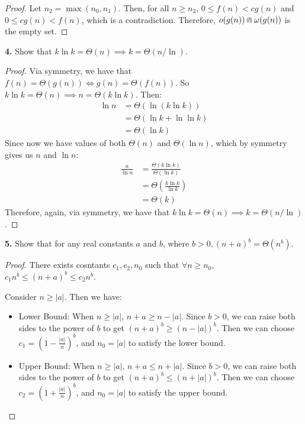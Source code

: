 \documentclass[addpoints]{exam}
\begin{document}
\begin{questions}
\begin{solution}
\begin{proof}
      Let $ n_2 = \max(n_0, n_1) $. Then, for all $ n \geq n_2 $, $ 0 \leq f(n) < cg(n) $ and $ 0 \leq cg(n) < f(n) $, which is a contradiction. Therefore, $ o(g(n)) \doublecap \omega(g(n)) $ is the empty set.
    \end{proof}
  \end{solution}
  \newpage
  \question
  \textbf{4. } Show that $ k \ln k = \Theta(n) \implies k = \Theta(n / \ln) $.
  \begin{solution}
    \begin{proof} \vspace*{-4mm}
      Via symmetry, we have that $ f(n) = \Theta(g(n)) \iff g(n) = \Theta(f(n)) $. So $ k \ln k = \Theta(n) \implies n = \Theta(k\ln k)  $. Then: \vspace*{-2mm}
      \begin{align*}
        \ln n & = \Theta(\ln(k\ln k))       \\
              & = \Theta(\ln k + \ln \ln k) \\
              & = \Theta(\ln k)
      \end{align*}
      Since now we have values of both $ \Theta(n) $ and $ \Theta(\ln n) $, which by symmetry gives us $n$ and $\ln n$: \vspace*{-2mm}
      \begin{align*}
        \displaystyle\frac{n}{\ln n} &= \displaystyle\frac{\Theta(k \ln k)}{\Theta(\ln k)} \\ 
        &= \Theta\left(\displaystyle\frac{k \ln k}{\ln k}\right) \\
        &= \Theta(k)
      \end{align*}
      Therefore, again, via symmetry, we have that $ k \ln k = \Theta(n) \implies k = \Theta(n / \ln) $.
    \end{proof}
  \end{solution}

  \question
  \textbf{5. } Show that for any real constants $a$ and $b$, where $ b > 0, (n + a)^b = \Theta(n^b) $.
  \begin{solution}
    \begin{proof} \vspace*{-4mm}
      There exists cosntants $ c_1, c_2, n_0 $ such that $ \forall n \geq n_0 $, $ c_1 n^b \leq (n + a)^b \leq c_2n^b $.

      Consider $ n \geq |a| $. Then we have: \vspace*{-2mm}
      \begin{itemize}
        \item Lower Bound: When $ n \geq |a| $, $ n + a \geq n - |a| $. Since $b > 0$, we can raise both sides to the power of $b$ to get $ (n + a)^b \geq (n - |a|)^b $. Then we can choose $ c_1 = (1 - \displaystyle\frac{|a|}{n})^b $, and $ n_0 = |a| $ to satisfy the lower bound. 
        \item Upper Bound: When $ n \geq |a| $, $ n + a \leq n + |a| $. Since $b > 0$, we can raise both sides to the power of $b$ to get $ (n + a)^b \leq (n + |a|)^b $. Then we can choose $ c_2 = (1 + \displaystyle\frac{|a|}{n})^b $, and $ n_0 = |a| $ to satisfy the upper bound.
      \end{itemize}


\end{proof}
\end{solution}
\end{questions}
\end{document}
